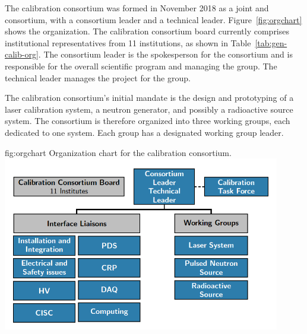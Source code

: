 The calibration consortium was formed in November 2018 as a joint  and  consortium, with a consortium leader and a technical leader. Figure~\ref{fig:orgchart} shows the organization. %
The calibration consortium board currently comprises institutional representatives from 11 institutions, as shown in Table~\ref{tab:gen-calib-org}. The consortium leader is the spokesperson for the consortium and is responsible for the overall scientific program and managing the group. The technical leader %
manages the project for the group. 

The calibration consortium's initial mandate is the design and prototyping of a laser calibration system, a neutron generator, and possibly a radioactive source system. The consortium is therefore organized into three working groups, each dedicated to one system. Each group has a designated working group leader.

\begin{dunefigure}{fig:orgchart}
{Organization chart for the calibration consortium.}
\includegraphics[height=3.0in]{graphics/orgchart-dp-v2.png}
\end{dunefigure}

